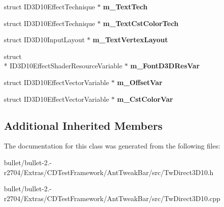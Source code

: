 \begin{DoxyCompactItemize}
\item 
\hypertarget{class_c_tw_graph_direct3_d10_abb5580e5944aa4bfc56c5d5c288f7859}{struct I\+D3\+D10\+Effect\+Technique $\ast$ {\bfseries m\+\_\+\+Text\+Tech}}\label{class_c_tw_graph_direct3_d10_abb5580e5944aa4bfc56c5d5c288f7859}

\item 
\hypertarget{class_c_tw_graph_direct3_d10_a840e1ce7243564d02b34caa1c7a70bc6}{struct I\+D3\+D10\+Effect\+Technique $\ast$ {\bfseries m\+\_\+\+Text\+Cst\+Color\+Tech}}\label{class_c_tw_graph_direct3_d10_a840e1ce7243564d02b34caa1c7a70bc6}

\item 
\hypertarget{class_c_tw_graph_direct3_d10_a352a82a44a4530354a6ec670371ec7c8}{struct I\+D3\+D10\+Input\+Layout $\ast$ {\bfseries m\+\_\+\+Text\+Vertex\+Layout}}\label{class_c_tw_graph_direct3_d10_a352a82a44a4530354a6ec670371ec7c8}

\item 
\hypertarget{class_c_tw_graph_direct3_d10_a355b8b540c22da76958a3cbcd1db84e5}{struct \\*
I\+D3\+D10\+Effect\+Shader\+Resource\+Variable $\ast$ {\bfseries m\+\_\+\+Font\+D3\+D\+Res\+Var}}\label{class_c_tw_graph_direct3_d10_a355b8b540c22da76958a3cbcd1db84e5}

\item 
\hypertarget{class_c_tw_graph_direct3_d10_a2fb40567d89b52fc7b0b61daf382af4f}{struct I\+D3\+D10\+Effect\+Vector\+Variable $\ast$ {\bfseries m\+\_\+\+Offset\+Var}}\label{class_c_tw_graph_direct3_d10_a2fb40567d89b52fc7b0b61daf382af4f}

\item 
\hypertarget{class_c_tw_graph_direct3_d10_ac6df0b8fa32185856ba35d849525ca51}{struct I\+D3\+D10\+Effect\+Vector\+Variable $\ast$ {\bfseries m\+\_\+\+Cst\+Color\+Var}}\label{class_c_tw_graph_direct3_d10_ac6df0b8fa32185856ba35d849525ca51}

\end{DoxyCompactItemize}
\subsection*{Additional Inherited Members}


The documentation for this class was generated from the following files\+:\begin{DoxyCompactItemize}
\item 
bullet/bullet-\/2.-\/r2704/\+Extras/\+C\+D\+Test\+Framework/\+Ant\+Tweak\+Bar/src/Tw\+Direct3\+D10.\+h\item 
bullet/bullet-\/2.-\/r2704/\+Extras/\+C\+D\+Test\+Framework/\+Ant\+Tweak\+Bar/src/Tw\+Direct3\+D10.\+cpp\end{DoxyCompactItemize}
